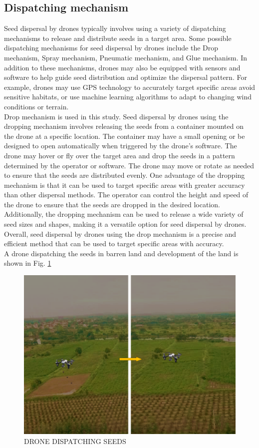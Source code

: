 \documentclass[conference]{IEEEtran}
\begin{document}
\subsection{Dispatching mechanism}

Seed dispersal by drones typically involves using a variety of dispatching mechanisms to release and distribute seeds in a target area\cite{7}. Some possible dispatching mechanisms for seed dispersal by drones include the Drop mechanism, Spray mechanism, Pneumatic mechanism, and Glue mechanism. In addition to these mechanisms, drones may also be equipped with sensors and software to help guide seed distribution and optimize the dispersal pattern. For example, drones may use GPS technology to accurately target specific areas avoid sensitive habitats, or use machine learning algorithms to adapt to changing wind conditions or terrain.
\\Drop mechanism is used in this study. Seed dispersal by drones using the dropping mechanism involves releasing the seeds from a container mounted on the drone at a specific location. The container may have a small opening or be designed to open automatically when triggered by the drone's software. The drone may hover or fly over the target area and drop the seeds in a pattern determined by the operator or software. The drone may move or rotate as needed to ensure that the seeds are distributed evenly. One advantage of the dropping mechanism is that it can be used to target specific areas with greater accuracy than other dispersal methods. The operator can control the height and speed of the drone to ensure that the seeds are dropped in the desired location. Additionally, the dropping mechanism can be used to release a wide variety of seed sizes and shapes, making it a versatile option for seed dispersal by drones. Overall, seed dispersal by drones using the drop mechanism is a precise and efficient method that can be used to target specific areas with accuracy.
\\A drone dispatching the seeds in barren land and development of the land  is shown in Fig. \ref{dis}

\begin{figure}[htp]
    \centering
    \includegraphics[scale = 0.3]{Slide2.PNG}
    \caption{DRONE DISPATCHING SEEDS}
    \label{dis}
\end{figure}
\end{document}
